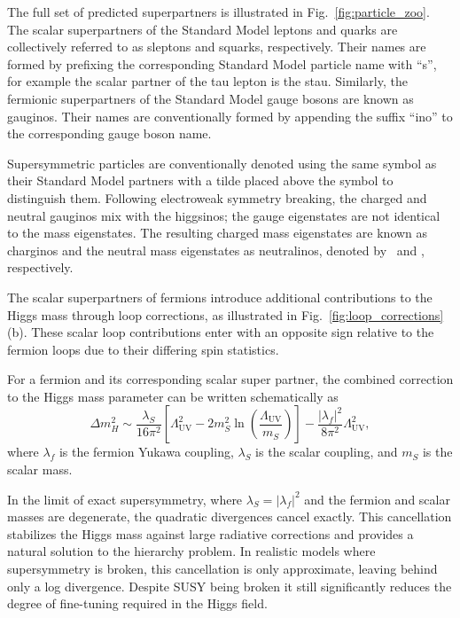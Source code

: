 The full set of predicted superpartners is illustrated in Fig.~\ref{fig:particle_zoo}. The scalar superpartners of the Standard Model leptons and quarks are collectively referred to as sleptons and squarks, respectively. Their names are formed by prefixing the corresponding Standard Model particle name with ``s'', for example the scalar partner of the tau lepton is the stau. Similarly, the fermionic superpartners of the Standard Model gauge bosons are known as gauginos. Their names are conventionally formed by appending the suffix ``ino'' to the corresponding gauge boson name.

Supersymmetric particles are conventionally denoted using the same symbol as their Standard Model partners with a tilde placed above the symbol to distinguish them. Following electroweak symmetry breaking, the charged and neutral gauginos mix with the higgsinos; the gauge eigenstates are not identical to the mass eigenstates. The resulting charged mass eigenstates are known as charginos and the neutral mass eigenstates as neutralinos, denoted by \chinopm\ and \nino, respectively. 

The scalar superpartners of fermions introduce additional contributions to the Higgs mass through loop corrections, as illustrated in Fig.~\ref{fig:loop_corrections}(b). These scalar loop contributions enter with an opposite sign relative to the fermion loops due to their differing spin statistics. 

For a fermion and its corresponding scalar super partner, the combined correction to the Higgs mass parameter can be written schematically as
\begin{equation}
\Delta m_H^2 \sim \frac{\lambda_S}{16\pi^2} \left[ \Lambda_{\mathrm{UV}}^2 - 2 m_S^2 \ln \left(\frac{\Lambda_{\mathrm{UV}}}{m_S} \right) \right]
- \frac{|\lambda_f|^2}{8\pi^2} \Lambda_{\mathrm{UV}}^2,
\end{equation}
where $\lambda_f$ is the fermion Yukawa coupling, $\lambda_S$ is the scalar coupling, and $m_S$ is the scalar mass.

In the limit of exact supersymmetry, where $\lambda_S = |\lambda_f|^2$ and the fermion and scalar masses are degenerate, the quadratic divergences cancel exactly. This cancellation stabilizes the Higgs mass against large radiative corrections and provides a natural solution to the hierarchy problem. In realistic models where supersymmetry is broken, this cancellation is only approximate, leaving behind only a log divergence. Despite SUSY being broken it still significantly reduces the degree of fine-tuning required in the Higgs field.


